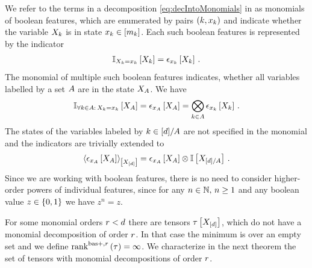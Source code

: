 We refer to the terms in a decomposition \eqref{eq:decIntoMonomials} in  as monomials of boolean features, which are enumerated by pairs $(k,x_{k})$ and indicate whether the variable $X_{k}$ is in state $x_{k}\in[m_{k}]$.
Each such boolean features is represented by the indicator
\begin{align*}
    \mathbb{I}_{X_{k}=x_{k}}\left[X_{k}\right] =
    \epsilon_{x_{k}}\left[X_{k}\right] \, .
\end{align*}
The monomial of multiple such boolean features indicates, whether all variables labelled by a set $A$ are in the state $X_{A}$.
We have
\begin{align*}
    \mathbb{I}_{\forall{k\in A}: \, X_{k}=x_{k}}\left[X_{A}\right]
    = \epsilon_{x_{A}}\left[X_{A}\right] = \bigotimes_{k\in A} \epsilon_{x_{k}}\left[X_{k}\right]  \, .
\end{align*}
The states of the variables labeled by $k\in[d]/A$ are not specified in the monomial and the indicators are trivially extended to
\begin{align*}
    \left\langle \epsilon_{x_{A}}\left[X_{A}\right]\right\rangle_{\left[ X_{[d]} \right]}
    = \epsilon_{x_{A}}\left[X_{A}\right] \otimes \mathbb{I}\left[X_{[d]/A}\right] \, .
\end{align*}
Since we are working with boolean features, there is no need to consider higher-order powers of individual features, since for any $n\in\mathbb{N}, \, n\geq1$ and any boolean value $z\in\{0,1\}$ we have $z^n=z$.

For some monomial orders $r<d$ there are tensors $\tau\left[X_{[d]}\right]$, which do not have a monomial decomposition of order $r$.
In that case the minimum is over an empty set and we define $\mathrm{rank}^{\mathrm{bas+},r}\left(\tau\right)=\infty$.
We characterize in the next theorem the set of tensors with monomial decompositions of order $r$.

